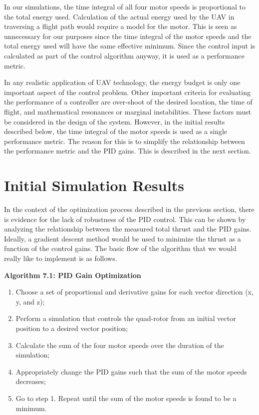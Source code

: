 In our simulations, the time integral of all four motor speeds is proportional to the total energy used. Calculation of the actual energy used by the UAV in traversing a flight path would require a model for the motor. This is seen as unnecessary for our purposes since the time integral of the motor speeds and the total energy used will have the same effective minimum. Since the control input is calculated as part of the control algorithm anyway, it is used as a performance metric.

In any realistic application of UAV technology, the energy budget is only one important aspect of the control problem. Other important criteria for evaluating the performance of a controller are over-shoot of the desired location, the time of flight, and mathematical resonances or marginal instabilities. These factors must be considered in the design of the system. However, in the initial results described below, the time integral of the motor speeds is used as a single performance metric. The reason for this is to simplify the relationship between the performance metric and the PID gains. This is described in the next section.


\section{Initial Simulation Results}

In the context of the optimization process described in the previous section, there is evidence for the lack of robustness of the PID control. This can be shown by analyzing the relationship between the measured total thrust and the PID gains. Ideally, a gradient descent method would be used to minimize the thrust as a function of the control gains. The basic flow of the algorithm that we would really like to implement is as follows.

\begin{center}\textbf{Algorithm 7.1: PID Gain Optimization}\end{center}
\begin{enumerate}
\item Choose a set of proportional and derivative gains for each vector direction (x, y, and z);
\item Perform a simulation that controls the quad-rotor from an initial vector position to a desired vector position;
\item Calculate the sum of the four motor speeds over the duration of the simulation;
\item Appropriately change the PID gains such that the sum of the motor speeds decreases;
\item Go to step 1. Repeat until the sum of the motor speeds is found to be a minimum.
\end{enumerate}

